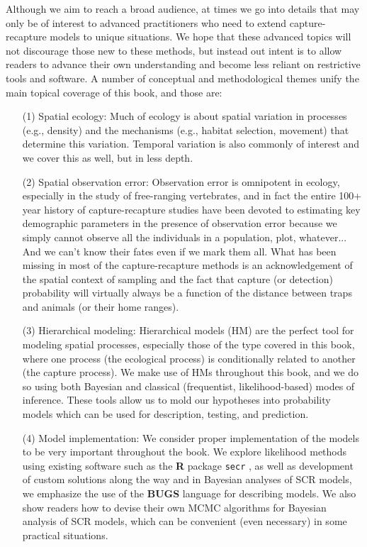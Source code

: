 Although we aim to reach a broad audience, at times we go into details
that may only be of interest to advanced practitioners who need to
extend capture-recapture models to unique situations.  We hope that
these advanced topics will not discourage those new to these methods,
but instead out intent is to allow readers to advance their own
understanding and become less reliant on restrictive tools and
software.
A number of conceptual and methodological
themes unify the main topical coverage of this book, and those are:


\begin{itemize}
\item[(1)]  Spatial ecology: Much of ecology is about spatial variation in
processes (e.g., density) and the mechanisms (e.g., habitat selection, movement) that
determine this variation. Temporal variation is also commonly of interest and
we cover this as well, but in less depth.

\item[(2)] Spatial observation error: Observation error is omnipotent in
ecology, especially in the study of free-ranging vertebrates, and in
fact the entire 100+ year history of capture-recapture studies have
been devoted to estimating key demographic parameters in the
presence of observation error because we simply cannot observe all
the individuals in a population, plot, whatever... And we can't know
their fates even if we mark them all. What has been missing in most
of the capture-recapture methods is an acknowledgement of the
spatial context of sampling and the fact that capture (or detection)
probability will virtually always be a function of the distance
between traps and animals (or their home ranges).


\item[(3)] Hierarchical modeling: Hierarchical models (HM) are the perfect tool for modeling spatial
processes, especially those of the type covered in this book, where
one process (the ecological process) is conditionally
related to another (the capture process). We make use of HMs
throughout this book, and we do so using both Bayesian and classical
 (frequentist, likelihood-based) modes of inference. These tools allow us to mold our hypotheses into
 probability models which can be used for description, testing, and
 prediction. 


\item[(4)]  Model implementation:  We consider proper implementation of the models to 
be very important throughout the book.  We explore likelihood methods using existing
  software such as the {\bf R} package \mbox{\tt secr}
  \citep{efford:2011}, as well as development of custom solutions
  along the way and in Bayesian analyses of SCR models, we emphasize
  the use of the {\bf BUGS} language for describing models.  We
  also show readers how to devise their own MCMC algorithms for
  Bayesian analysis of SCR models, which can be convenient (even
  necessary) in some practical situations.


\end{itemize}

